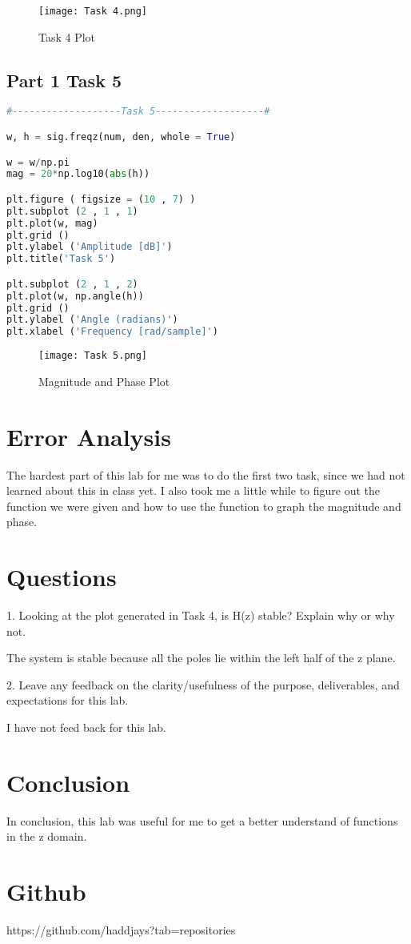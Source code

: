 \documentclass[11pt,a4]{report}
\begin{document}
\begin{figure}[h!]
    \begin{center}
  \caption{Task 4 Plot}
  \texttt{[image: Task 4.png]}
\end{center}
\end{figure}

\subsection{Part 1 Task 5}
\begin{lstlisting}[language=Python]
#-------------------Task 5-------------------#

w, h = sig.freqz(num, den, whole = True)

w = w/np.pi
mag = 20*np.log10(abs(h))

plt.figure ( figsize = (10 , 7) )
plt.subplot (2 , 1 , 1)
plt.plot(w, mag)
plt.grid ()
plt.ylabel ('Amplitude [dB]')
plt.title('Task 5')

plt.subplot (2 , 1 , 2)
plt.plot(w, np.angle(h))
plt.grid ()
plt.ylabel ('Angle (radians)')
plt.xlabel ('Frequency [rad/sample]')

\end{lstlisting}
\newpage
\begin{figure}[h!]
    \begin{center}
  \caption{Magnitude and Phase Plot}
  \texttt{[image: Task 5.png]}
\end{center}
\end{figure}



\section{Error Analysis}
The hardest part of this lab for me was to do the first two task, since we had not learned about this in class yet. I also took me a little while to figure out the function we were given and how to use the function to graph the magnitude and phase. 


\section{Questions}
1. Looking at the plot generated in Task 4, is H(z) stable? Explain why or why not.

The system is stable because all the poles lie within the left half of the z plane.

2. Leave any feedback on the clarity/usefulness of the purpose, deliverables, and expectations
for this lab.

I have not feed back for this lab.

\section{Conclusion}
In conclusion, this lab was useful for me to get a better understand of functions in the z domain. 

\section{Github}
https://github.com/haddjays?tab=repositories
\end{document}
